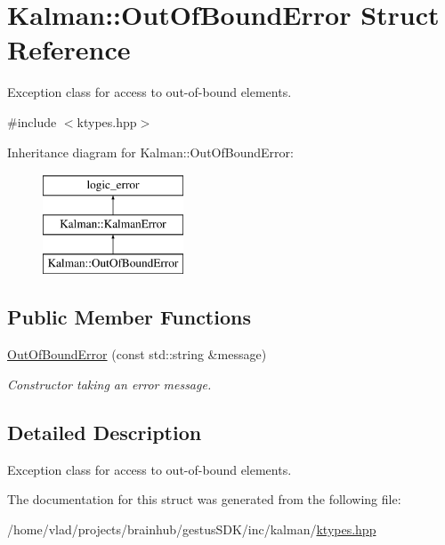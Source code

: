 \hypertarget{structKalman_1_1OutOfBoundError}{}\section{Kalman\+:\+:Out\+Of\+Bound\+Error Struct Reference}
\label{structKalman_1_1OutOfBoundError}


Exception class for access to out-\/of-\/bound elements.  




{\ttfamily \#include $<$ktypes.\+hpp$>$}

Inheritance diagram for Kalman\+:\+:Out\+Of\+Bound\+Error\+:\begin{figure}[H]
\begin{center}
\leavevmode
\includegraphics[height=3.000000cm]{structKalman_1_1OutOfBoundError}
\end{center}
\end{figure}
\subsection*{Public Member Functions}
\begin{DoxyCompactItemize}
\item 
\mbox{\label{structKalman_1_1OutOfBoundError_a999d4a9b7434ae1a53b4d90f94076ee4}} 
\mbox{\hyperlink{structKalman_1_1OutOfBoundError_a999d4a9b7434ae1a53b4d90f94076ee4}{Out\+Of\+Bound\+Error}} (const std\+::string \&message)
\begin{DoxyCompactList}\small\item\em Constructor taking an error message. \end{DoxyCompactList}\end{DoxyCompactItemize}


\subsection{Detailed Description}
Exception class for access to out-\/of-\/bound elements. 

The documentation for this struct was generated from the following file\+:\begin{DoxyCompactItemize}
\item 
/home/vlad/projects/brainhub/gestus\+S\+D\+K/inc/kalman/\mbox{\hyperlink{ktypes_8hpp}{ktypes.\+hpp}}\end{DoxyCompactItemize}
